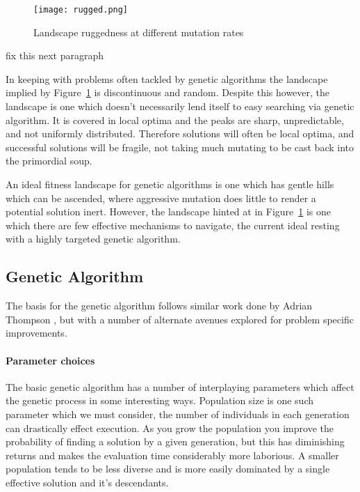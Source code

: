 \begin{figure}
	\centering
	\texttt{[image: rugged.png]}
	\caption{Landscape ruggedness at different mutation rates}
	\label{fig:rugged}
\end{figure}

\todo fix this next paragraph

In keeping with problems often tackled by genetic algorithms the landscape implied by Figure~\ref{fig:rugged}
is discontinuous
and random. Despite this however,
the landscape is one which doesn't necessarily lend itself to easy searching via genetic algorithm.
It is covered in local optima and the peaks are sharp, unpredictable, and not uniformly
distributed. Therefore solutions will often be local optima, and successful solutions will
be fragile, not taking much mutating to be cast back into the primordial soup.

An ideal fitness landscape for genetic algorithms is one which has gentle hills
which can be ascended, where aggressive mutation does little to render a potential
solution inert. However, the landscape hinted at in Figure~\ref{fig:rugged} is
one which there are few effective mechanisms to navigate, the current ideal resting
with a highly targeted genetic algorithm.

\subsection{Genetic Algorithm \label{ss:g_a}}

The basis for the genetic algorithm follows similar work done by Adrian Thompson
\cite{10.1007/3-540-63173-9_61}, but with a number of alternate avenues explored
for problem specific improvements.

\paragraph{Parameter choices}
The basic genetic algorithm has a number of interplaying parameters which affect the genetic
process in some interesting ways. Population size is one such parameter which we must consider,
the number of individuals in each generation can drastically effect execution. As you grow the
population you improve the probability of finding a solution by a given generation, but this has
diminishing returns and makes the evaluation time considerably more laborious. A smaller population
tends to be less diverse and is more easily dominated by a single effective solution
and it's descendants.

